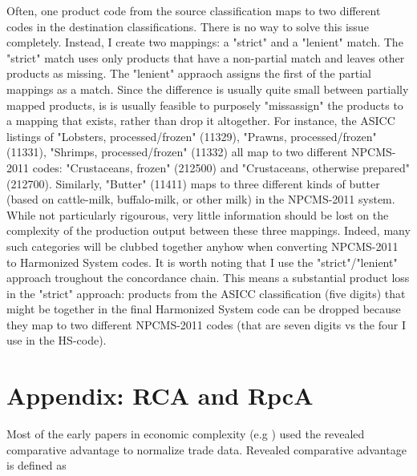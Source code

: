 \documentclass[11pt]{article}
\begin{document}
\begin{appendices}
Often, one product code from the source classification maps to two different codes in the destination classifications. There is no way to solve this issue completely. Instead, I create two mappings: a "strict" and a "lenient" match. The "strict" match uses only products that have a non-partial match and leaves other products as missing. The "lenient" appraoch assigns the first of the partial mappings as a match. Since the difference is usually quite small between partially mapped products, is is usually feasible to purposely "missassign" the products to a mapping that exists, rather than drop it altogether. For instance, the ASICC listings of "Lobsters, processed/frozen" (11329), "Prawns, processed/frozen" (11331), "Shrimps, processed/frozen" (11332) all map to two different NPCMS-2011 codes: "Crustaceans, frozen" (212500) and "Crustaceans, otherwise prepared" (212700). Similarly, "Butter" (11411) maps to three different kinds of butter (based on cattle-milk, buffalo-milk, or other milk) in the NPCMS-2011 system. While not particularly rigourous, very little information should be lost on the complexity of the production output between these three mappings. Indeed, many such categories will be clubbed together anyhow when converting NPCMS-2011 to Harmonized System codes. It is worth noting that I use the "strict"/"lenient" approach troughout the concordance chain. This means a substantial product loss in the "strict" approach: products from the ASICC classification (five digits) that might be together in the final Harmonized System code can be dropped because they map to two different NPCMS-2011 codes (that are seven digits vs the four I use in the HS-code).










\newpage 

\section{Appendix: RCA and RpcA}%
\label{sec:rca}
Most of the early papers in economic complexity (e.g \citealp{tacchella_new_2012,hidalgo_building_2009}) used the revealed comparative advantage \citep{balassa_trade_1965} to normalize trade data. Revealed comparative advantage is defined as


\end{appendices}
\end{document}

